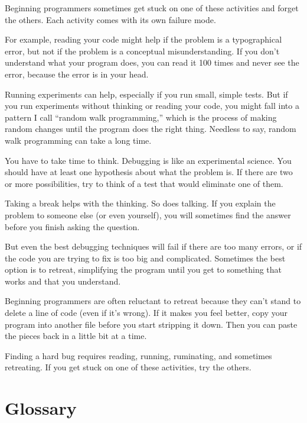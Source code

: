 \documentclass[10pt]{book}
\begin{document}
Beginning programmers sometimes get stuck on one of these activities
and forget the others.  Each activity comes with its own failure
mode.


For example, reading your code might help if the problem is a
typographical error, but not if the problem is a conceptual
misunderstanding.  If you don't understand what your program does, you
can read it 100 times and never see the error, because the error is in
your head.


Running experiments can help, especially if you run small, simple
tests.  But if you run experiments without thinking or reading your
code, you might fall into a pattern I call ``random walk programming,''
which is the process of making random changes until the program
does the right thing.  Needless to say, random walk programming
can take a long time.


You have to take time to think.  Debugging is like an
experimental science.  You should have at least one hypothesis about
what the problem is.  If there are two or more possibilities, try to
think of a test that would eliminate one of them.

Taking a break helps with the thinking.  So does talking.
If you explain the problem to someone else (or even yourself), you
will sometimes find the answer before you finish asking the question.

But even the best debugging techniques will fail if there are too many
errors, or if the code you are trying to fix is too big and
complicated.  Sometimes the best option is to retreat, simplifying the
program until you get to something that works and that you
understand.

Beginning programmers are often reluctant to retreat because
they can't stand to delete a line of code (even if it's wrong).
If it makes you feel better, copy your program into another file
before you start stripping it down.  Then you can paste the pieces
back in a little bit at a time.

Finding a hard bug requires reading, running, ruminating, and
sometimes retreating.  If you get stuck on one of these activities,
try the others.


\section{Glossary}
\end{document}
